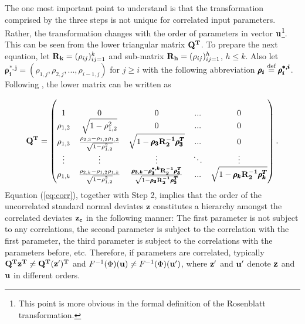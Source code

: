 \noindent
The one most important point to understand is that the transformation comprised by the three steps is not unique for correlated input parameters. Rather, the transformation changes with the order of parameters in vector $\bold{u}$\footnote{This point is more obvious in the formal definition of the Rosenblatt transformation.}. This can be seen from the lower triangular matrix $\bold{Q^T}$. To prepare the next equation, let $\bold{R_k} = (\rho_{ij})_{ij=1}^k$ and sub-matrix $\bold{R_h} = (\rho_{ij})_{ij=1}^h$, $h \leq k$. Also let $\pmb{\rho_i^{*,j}} = (\rho_{1,j}, \rho_{2,j}, ..., \rho_{i-1,j})$ for $j \geq i$ with the following abbreviation $\pmb{\rho_i}\stackrel{\text{def}}{=}\pmb{\rho_i^{*,i}}$. Following \cite{madar2015direct}, the lower matrix can be written as

\begin{align} \label{eq:corr}
\bold{Q^T} =
\begin{pmatrix}
\\ 1 & 0 & 0 & ... & 0
\\\rho_{1,2} & \sqrt{1-\rho_{1,2}^2} & 0 & ... & 0
\\ \rho_{1,3} & \frac{\rho_{2,3}-\rho_{1,2}\rho_{1,3}}{\sqrt{1-\rho_{1,2}^2}} & \sqrt{1-\pmb{\rho_{3}}\bold{R^{-1}_2}\pmb{\rho_{3}^T}} & ... & 0
\\\vdots & \vdots & \vdots & 	\ddots & \vdots
\\ \rho_{1,k} &\frac{\rho_{2,k}-\rho_{1,2}\rho_{1,k}}{\sqrt{1-\rho_{1,2}^2}} & \frac{\pmb{\rho_{3,k}}-\pmb{\rho_{3}^{*,k}}\bold{R^{-1}_2}\pmb{\rho_{3}^T}}{\sqrt{1-\pmb{\rho_{3}}\bold{R^{-1}_2}\pmb{\rho_{3}^T}}}  &
... & \sqrt{1-\pmb{\rho_{k}}\bold{R^{-1}_2}\pmb{\rho_{k}^T}}
\end{pmatrix}.
\end{align}
Equation (\ref{eq:corr}), together with Step 2, implies that the order of the uncorrelated standard normal deviates $\pmb{z}$ constitutes a hierarchy amongst the correlated deviates $\bold{z_c}$ in the following manner: The first parameter is not subject to any correlations, the second parameter is subject to the correlation with the first parameter, the third parameter is subject to the correlations with the parameters before, etc. Therefore, if parameters are correlated, typically $\bold{Q^T z^T} \neq \bold{Q^T (z')^T}$ and $F^{-1}(\Phi)(\bold{u}) \neq F^{-1}(\Phi)(\bold{u'})$, where $\bold{z'}$ and $\bold{u'}$ denote $\bold{z}$ and $\bold{u}$ in different orders.\\

